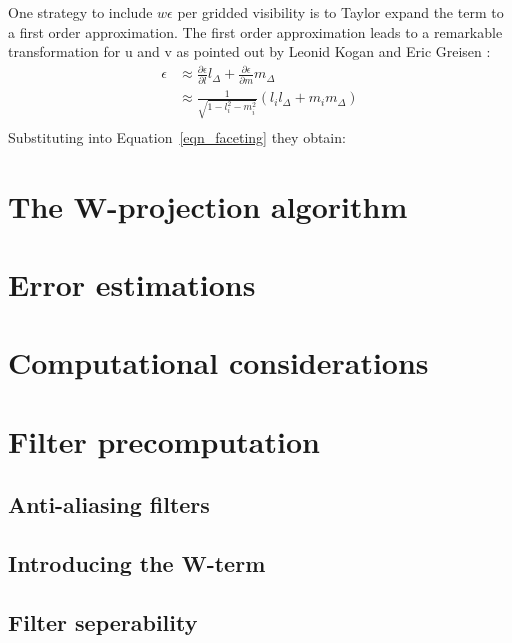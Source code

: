 One strategy to include $w\epsilon$ per gridded visibility is to Taylor expand the term to a first order approximation. The first order approximation
leads to a remarkable transformation for u and v as pointed out by Leonid Kogan and Eric Greisen \cite{aipsfaceting}:
\begin{equation}
 \begin{split}
  \epsilon&\approx \frac{\partial \epsilon}{\partial l}l_\Delta + \frac{\partial \epsilon}{\partial m}m_\Delta\\
  &\approx \frac{1}{\sqrt{1-l_i^2-m_i^2}}(l_il_\Delta + m_im_\Delta)\\
 \end{split}
\end{equation}
Substituting into Equation~\ref{eqn_faceting} they obtain:

\section{The W-projection algorithm}
\section{Error estimations}
\section{Computational considerations}
\section{Filter precomputation}
\subsection{Anti-aliasing filters}
\subsection{Introducing the W-term}
\subsection{Filter seperability}
